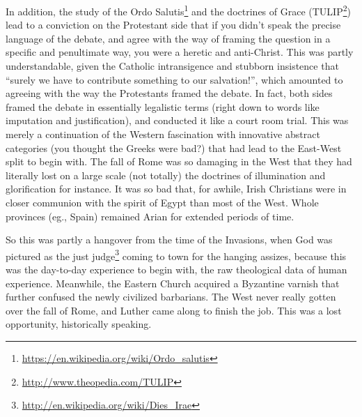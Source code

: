 In addition, the study of the Ordo Salutis\footnote{\url{https://en.wikipedia.org/wiki/Ordo\_salutis}} and the doctrines of Grace (TULIP\footnote{\url{http://www.theopedia.com/TULIP}}) lead to a conviction on the Protestant side that if you didn't speak the precise language of the debate, and agree with the way of framing the question in a specific and penultimate way, you were a heretic and anti-Christ. This was partly understandable, given the Catholic intransigence and stubborn insistence that ``surely we have to contribute something to our salvation!'', which amounted to agreeing with the way the Protestants framed the debate. In fact, both sides framed the debate in essentially legalistic terms (right down to words like imputation and justification), and conducted it like a court room trial. This was merely a continuation of the Western fascination with innovative abstract categories (you thought the Greeks were bad?) that had lead to the East-West split to begin with. The fall of Rome was so damaging in the West that they had literally lost on a large scale (not totally) the doctrines of illumination and glorification for instance. It was so bad that, for awhile, Irish Christians were in closer communion with the spirit of Egypt than most of the West. Whole provinces (eg., Spain) remained Arian for extended periods of time.

So this was partly a hangover from the time of the Invasions, when God was pictured as the just judge\footnote{\url{http://en.wikipedia.org/wiki/Dies\_Irae}} coming to town for the hanging assizes, because this was the day-to-day experience to begin with, the raw theological data of human experience. Meanwhile, the Eastern Church acquired a Byzantine varnish that further confused the newly civilized barbarians. The West never really gotten over the fall of Rome, and Luther came along to finish the job. This was a lost opportunity, historically speaking.

